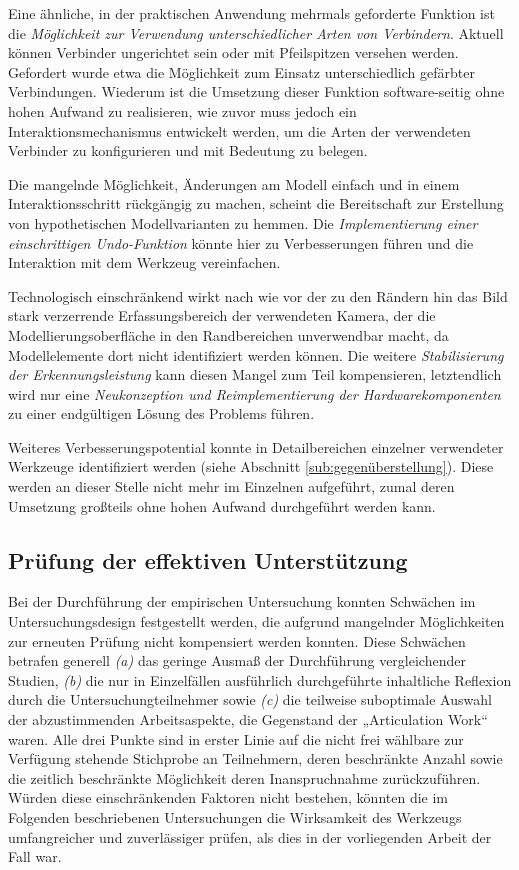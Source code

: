 Eine ähnliche, in der praktischen Anwendung mehrmals geforderte Funktion ist die \emph{Möglichkeit zur Verwendung unterschiedlicher Arten von Verbindern}. Aktuell können Verbinder ungerichtet sein oder mit Pfeilspitzen versehen werden. Gefordert wurde etwa die Möglichkeit zum Einsatz unterschiedlich gefärbter Verbindungen. Wiederum ist die Umsetzung dieser Funktion software-seitig ohne hohen Aufwand zu realisieren, wie zuvor muss jedoch ein Interaktionsmechanismus entwickelt werden, um die Arten der verwendeten Verbinder zu konfigurieren und mit Bedeutung zu belegen.

Die mangelnde Möglichkeit, Änderungen am Modell einfach und in einem Interaktionsschritt rückgängig zu machen, scheint die Bereitschaft zur Erstellung von hypothetischen Modellvarianten zu hemmen. Die \emph{Implementierung einer einschrittigen Undo-Funktion} könnte hier zu Verbesserungen führen und die Interaktion mit dem Werkzeug vereinfachen.

Technologisch einschränkend wirkt nach wie vor der zu den Rändern hin das Bild stark verzerrende Erfassungsbereich der verwendeten Kamera, der die Modellierungsoberfläche in den Randbereichen unverwendbar macht, da Modellelemente dort nicht identifiziert werden können. Die weitere \emph{Stabilisierung der Erkennungsleistung} kann diesen Mangel zum Teil kompensieren, letztendlich wird nur eine \emph{Neukonzeption und Reimplementierung der Hardwarekomponenten} zu einer endgültigen Lösung des Problems führen.

Weiteres Verbesserungspotential konnte in Detailbereichen einzelner verwendeter Werkzeuge identifiziert werden (siehe Abschnitt \ref{sub:gegenüberstellung}). Diese werden an dieser Stelle nicht mehr im Einzelnen aufgeführt, zumal deren Umsetzung großteils ohne hohen Aufwand durchgeführt werden kann.


\subsection{Prüfung der effektiven Unterstützung} %
\label{sub:prüfung_der_wirksamkeit}

Bei der Durchführung der empirischen Untersuchung konnten Schwächen im Untersuchungsdesign festgestellt werden, die aufgrund mangelnder Möglichkeiten zur erneuten Prüfung nicht kompensiert werden konnten. Diese Schwächen betrafen generell \emph{(a)} das geringe Ausmaß der Durchführung vergleichender Studien, \emph{(b)} die nur in Einzelfällen ausführlich durchgeführte inhaltliche Reflexion durch die Untersuchungteilnehmer sowie \emph{(c)} die teilweise suboptimale Auswahl der abzustimmenden Arbeitsaspekte, die Gegenstand der „Articulation Work“ waren. Alle drei Punkte sind in erster Linie auf die nicht frei wählbare zur Verfügung stehende Stichprobe an Teilnehmern, deren beschränkte Anzahl sowie die zeitlich beschränkte Möglichkeit deren Inanspruchnahme zurückzuführen. Würden diese einschränkenden Faktoren nicht bestehen, könnten die im Folgenden beschriebenen Untersuchungen die Wirksamkeit des Werkzeugs umfangreicher und zuverlässiger prüfen, als dies in der vorliegenden Arbeit der Fall war.

